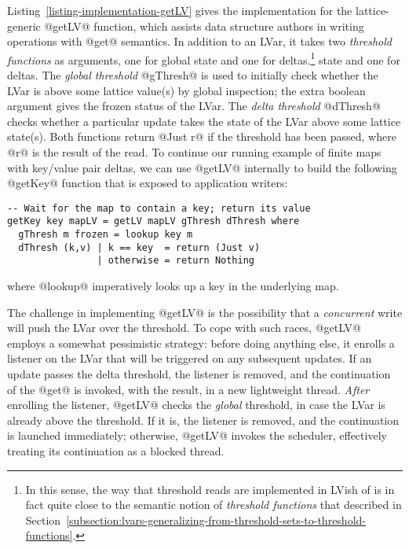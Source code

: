 Listing~\ref{listing-implementation-getLV} gives the implementation
for the lattice-generic @getLV@ function, which assists data structure
authors in writing operations with @get@ semantics.  In addition to an
LVar, it takes two \emph{threshold functions} as arguments, one for
global
\ifdefined\DISSERTATION
state and one for deltas.\footnote{In this sense, the way that
  threshold reads are implemented in LVish of is in fact quite close
  to the semantic notion of \emph{threshold functions} that 
  described in
  Section~\ref{subsection:lvars-generalizing-from-threshold-sets-to-threshold-functions}.}
\fi
\ifdefined\JOURNAL
state and one for deltas.
\fi
The \emph{global threshold} @gThresh@ is used to initially check
whether the LVar is above some lattice value(s) by global inspection;
the extra boolean argument gives the frozen status of the LVar.  The
\emph{delta threshold} @dThresh@ checks whether a particular update
takes the state of the LVar above some lattice state(s).  Both
functions return @Just r@ if the threshold has been passed, where @r@
is the result of the read.  To continue our running example of finite
maps with key/value pair deltas, we can use @getLV@ internally to
build the following @getKey@ function that is exposed to application
writers:

\singlespacing
\begin{lstlisting}
-- Wait for the map to contain a key; return its value
getKey key mapLV = getLV mapLV gThresh dThresh where
  gThresh m frozen = lookup key m
  dThresh (k,v) | k == key  = return (Just v)
                | otherwise = return Nothing 
\end{lstlisting}
\doublespacing

where @lookup@ imperatively looks up a key in the underlying map.

\singlespacing

\doublespacing

The challenge in implementing @getLV@ is the possibility that a
\emph{concurrent} write will push the LVar over the threshold.  To
cope with such races, @getLV@ employs a somewhat pessimistic strategy:
before doing anything else, it enrolls a listener on the LVar that
will be triggered on any subsequent updates.  If an update passes the
delta threshold, the listener is removed, and the continuation of the
@get@ is invoked, with the result, in a new lightweight thread.
\emph{After} enrolling the listener, @getLV@ checks the \emph{global}
threshold, in case the LVar is already above the threshold.  If it is,
the listener is removed, and the continuation is launched immediately;
otherwise, @getLV@ invokes the scheduler, effectively treating its
continuation as a blocked thread.

